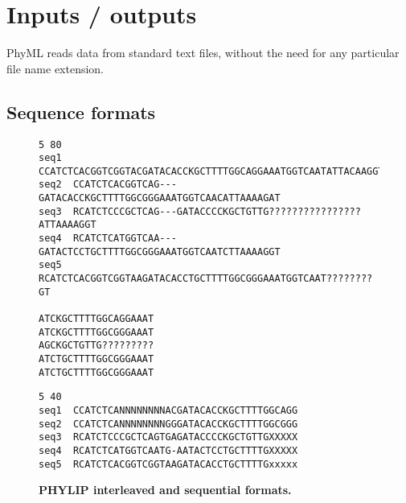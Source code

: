 \documentclass[a4paper,12pt]{article}
\begin{document}
\section{Inputs / outputs}\label{sec:input_output}

PhyML reads data from standard text files,  without the need for any particular file name extension.

\subsection{Sequence formats}

\begin{figure}
\begin{small}
\begin{Verbatim}[frame=single, label=PHYLIP interleaved, samepage=true, baselinestretch=0.5]
5 80
seq1  CCATCTCACGGTCGGTACGATACACCKGCTTTTGGCAGGAAATGGTCAATATTACAAGGT
seq2  CCATCTCACGGTCAG---GATACACCKGCTTTTGGCGGGAAATGGTCAACATTAAAAGAT
seq3  RCATCTCCCGCTCAG---GATACCCCKGCTGTTG????????????????ATTAAAAGGT
seq4  RCATCTCATGGTCAA---GATACTCCTGCTTTTGGCGGGAAATGGTCAATCTTAAAAGGT
seq5  RCATCTCACGGTCGGTAAGATACACCTGCTTTTGGCGGGAAATGGTCAAT????????GT

ATCKGCTTTTGGCAGGAAAT
ATCKGCTTTTGGCGGGAAAT
AGCKGCTGTTG?????????
ATCTGCTTTTGGCGGGAAAT
ATCTGCTTTTGGCGGGAAAT
\end{Verbatim}
\begin{Verbatim}[frame=single, label=PHYLIP sequential, samepage=true, baselinestretch=0.5]
5 40
seq1  CCATCTCANNNNNNNNACGATACACCKGCTTTTGGCAGG
seq2  CCATCTCANNNNNNNNGGGATACACCKGCTTTTGGCGGG
seq3  RCATCTCCCGCTCAGTGAGATACCCCKGCTGTTGXXXXX
seq4  RCATCTCATGGTCAATG-AATACTCCTGCTTTTGXXXXX
seq5  RCATCTCACGGTCGGTAAGATACACCTGCTTTTGxxxxx
\end{Verbatim}
\end{small}
\label{fig:align_tree}
\caption{\bf PHYLIP interleaved and sequential formats.}
\end{figure}
\end{document}
